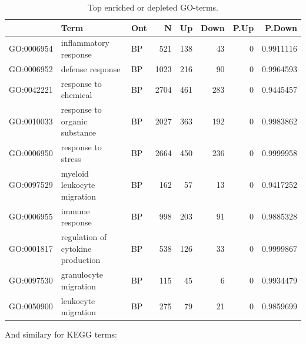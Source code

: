 \documentclass[9pt,a4paper,]{extarticle}
\newenvironment{Shaded}{\begin{snugshade}}{\end{snugshade}}
\newcommand{\KeywordTok}[1]{\textcolor[rgb]{0.13,0.29,0.53}{\textbf{{#1}}}}
\newcommand{\DataTypeTok}[1]{\textcolor[rgb]{0.13,0.29,0.53}{{#1}}}
\newcommand{\DecValTok}[1]{\textcolor[rgb]{0.00,0.00,0.81}{{#1}}}
\newcommand{\StringTok}[1]{\textcolor[rgb]{0.31,0.60,0.02}{{#1}}}
\newcommand{\CommentTok}[1]{\textcolor[rgb]{0.56,0.35,0.01}{\textit{{#1}}}}
\newcommand{\OtherTok}[1]{\textcolor[rgb]{0.56,0.35,0.01}{{#1}}}
\newcommand{\NormalTok}[1]{{#1}}
\begin{document}
\begin{table}[t]

\caption{\label{tab:goanna}Top enriched or depleted GO-terms.}
\centering
\begin{tabular}{l|l|l|r|r|r|r|r}
\hline
  & Term & Ont & N & Up & Down & P.Up & P.Down\\
\hline
GO:0006954 & inflammatory response & BP & 521 & 138 & 43 & 0 & 0.9911116\\
\hline
GO:0006952 & defense response & BP & 1023 & 216 & 90 & 0 & 0.9964593\\
\hline
GO:0042221 & response to chemical & BP & 2704 & 461 & 283 & 0 & 0.9445457\\
\hline
GO:0010033 & response to organic substance & BP & 2027 & 363 & 192 & 0 & 0.9983862\\
\hline
GO:0006950 & response to stress & BP & 2664 & 450 & 236 & 0 & 0.9999958\\
\hline
GO:0097529 & myeloid leukocyte migration & BP & 162 & 57 & 13 & 0 & 0.9417252\\
\hline
GO:0006955 & immune response & BP & 998 & 203 & 91 & 0 & 0.9885328\\
\hline
GO:0001817 & regulation of cytokine production & BP & 538 & 126 & 33 & 0 & 0.9999867\\
\hline
GO:0097530 & granulocyte migration & BP & 115 & 45 & 6 & 0 & 0.9934479\\
\hline
GO:0050900 & leukocyte migration & BP & 275 & 79 & 21 & 0 & 0.9859699\\
\hline
\end{tabular}
\end{table}

And similary for KEGG terms:

\begin{Shaded}
\end{Shaded}
\end{document}
